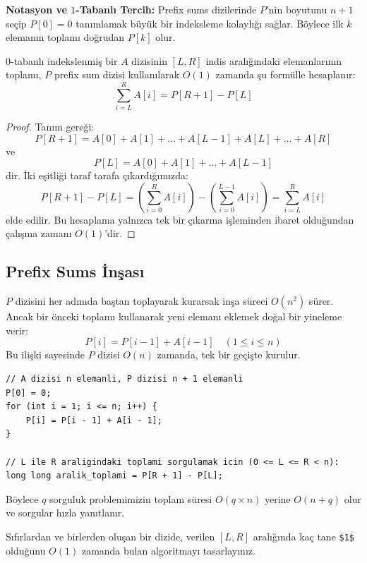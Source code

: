 \textbf{Notasyon ve $1$-Tabanlı Tercih:} Prefix sums dizilerinde $P$'nin boyutunu $n+1$ seçip $P[0] = 0$ tanımlamak büyük bir indeksleme kolaylığı sağlar. Böylece ilk $k$ elemanın toplamı doğrudan $P[k]$ olur.

\begin{theorem}
$0$-tabanlı indekslenmiş bir $A$ dizisinin $[L, R]$ indis aralığındaki elemanlarının toplamı, $P$ prefix sum dizisi kullanılarak $O(1)$ zamanda şu formülle hesaplanır:
\[
\sum_{i=L}^{R} A[i] = P[R+1] - P[L]
\]
\end{theorem}

\begin{proof}
Tanım gereği:
\[
P[R+1] = A[0] + A[1] + \dots + A[L-1] + A[L] + \dots + A[R]
\]
ve
\[
P[L] = A[0] + A[1] + \dots + A[L-1]
\]
dir. İki eşitliği taraf tarafa çıkardığımızda:
\[
P[R+1] - P[L] = \left(\sum_{i=0}^{R} A[i]\right) - \left(\sum_{i=0}^{L-1} A[i]\right) = \sum_{i=L}^{R} A[i]
\]
elde edilir. Bu hesaplama yalnızca tek bir çıkarma işleminden ibaret olduğundan çalışma zamanı $O(1)$'dir.
\end{proof}

\subsection{Prefix Sums İnşası}
$P$ dizisini her adımda baştan toplayarak kurarsak inşa süreci $O(n^2)$ sürer. Ancak bir önceki toplamı kullanarak yeni elemanı eklemek doğal bir yineleme verir:
\[
P[i] = P[i-1] + A[i-1] \quad (1 \le i \le n)
\]
Bu ilişki sayesinde $P$ dizisi $O(n)$ zamanda, tek bir geçişte kurulur.

\begin{lstlisting}[language=CTemel]
// A dizisi n elemanli, P dizisi n + 1 elemanli
P[0] = 0;
for (int i = 1; i <= n; i++) {
    P[i] = P[i - 1] + A[i - 1];
}

// L ile R araligindaki toplami sorgulamak icin (0 <= L <= R < n):
long long aralik_toplami = P[R + 1] - P[L];
\end{lstlisting}

Böylece $q$ sorguluk problemimizin toplam süresi $O(q \times n)$ yerine $O(n + q)$ olur ve sorgular hızla yanıtlanır.

\begin{example}
Sıfırlardan ve birlerden oluşan bir dizide, verilen $[L, R]$ aralığında kaç tane \texttt{\$1\$} olduğunu $O(1)$ zamanda bulan algoritmayı tasarlayınız.
\end{example}

